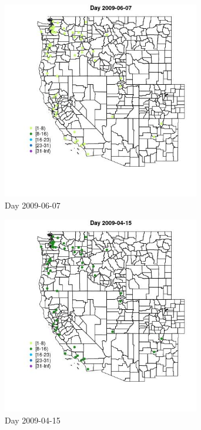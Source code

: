 \begin{figure} 
\centering  
\includegraphics[width=0.77\textwidth]{Code_Outputs/Report_ML_input_PM25_Step4_part_e_de_duplicated_aves_MapObsDay2009-06-07.jpg} 
\caption{\label{fig:Report_ML_input_PM25_Step4_part_e_de_duplicated_avesMapObsDay2009-06-07}Day 2009-06-07} 
\end{figure} 
 

\begin{figure} 
\centering  
\includegraphics[width=0.77\textwidth]{Code_Outputs/Report_ML_input_PM25_Step4_part_e_de_duplicated_aves_MapObsDay2009-04-15.jpg} 
\caption{\label{fig:Report_ML_input_PM25_Step4_part_e_de_duplicated_avesMapObsDay2009-04-15}Day 2009-04-15} 
\end{figure} 
 

